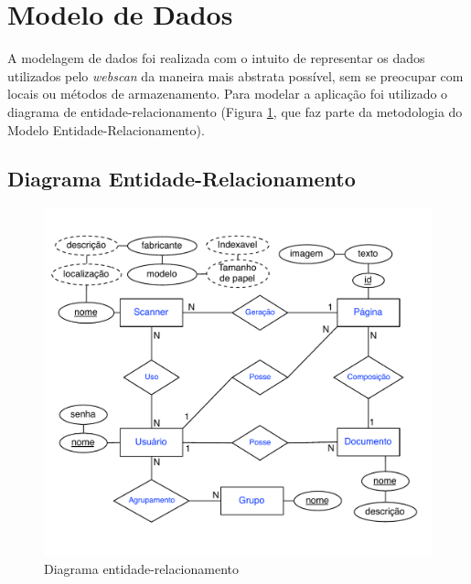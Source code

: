 
\section{Modelo de Dados}
\label{sec:modelo_de_dados}

A modelagem de dados foi realizada com o intuito de representar os dados utilizados pelo \emph{webscan}
da maneira mais abstrata possível, sem se preocupar com locais ou métodos de armazenamento.
Para modelar a aplicação foi utilizado o diagrama de entidade-relacionamento (Figura \ref{fig:der},
que faz parte da metodologia do Modelo Entidade-Relacionamento). 

\subsection{Diagrama Entidade-Relacionamento}
\begin{figure}[ht]
 \centering
  \includegraphics[scale=0.75]{img/der.pdf}
  \caption {Diagrama entidade-relacionamento}
  \label{fig:der}
\end{figure}
